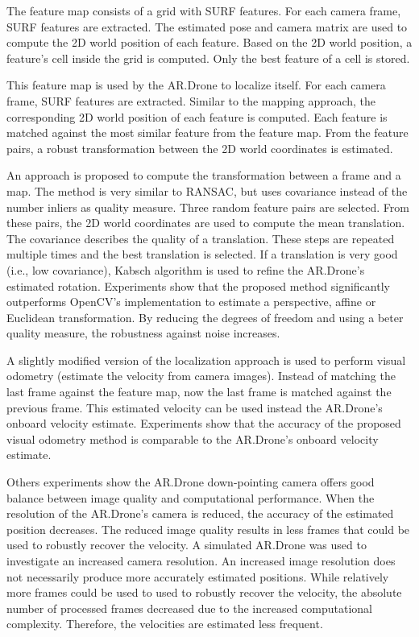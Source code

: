 The feature map consists of a grid with SURF features.
For each camera frame, SURF features are extracted.
The estimated pose and camera matrix are used to compute the 2D world position of each feature.
Based on the 2D world position, a feature's cell inside the grid is computed.
Only the best feature of a cell is stored.

This feature map is used by the AR.Drone to localize itself.
For each camera frame, SURF features are extracted.
Similar to the mapping approach, the corresponding 2D world position of each feature is computed.
Each feature is matched against the most similar feature from the feature map.
From the feature pairs, a robust transformation between the 2D world coordinates is estimated.

An approach is proposed to compute the transformation between a frame and a map.
The method is very similar to RANSAC, but uses covariance instead of the number inliers as quality measure.
Three random feature pairs are selected.
From these pairs, the 2D world coordinates are used to compute the mean translation.
The covariance describes the quality of a translation.
These steps are repeated multiple times and the best translation is selected.
If a translation is very good (i.e., low covariance), Kabsch algorithm is used to refine the AR.Drone's estimated rotation.
Experiments show that the proposed method significantly outperforms OpenCV's implementation to estimate a perspective, affine or Euclidean transformation.
By reducing the degrees of freedom and using a beter quality measure, the robustness against noise increases.

A slightly modified version of the localization approach is used to perform visual odometry (estimate the velocity from camera images).
Instead of matching the last frame against the feature map, now the last frame is matched against the previous frame.
This estimated velocity can be used instead 
 the AR.Drone's onboard velocity estimate.
Experiments show that the accuracy of the proposed visual odometry method is comparable to the AR.Drone's onboard velocity estimate.

Others experiments show the AR.Drone down-pointing camera offers good balance between image quality and computational performance.
When the resolution of the AR.Drone's camera is reduced, the accuracy of the estimated position decreases.
The reduced image quality results in less frames that could be used to robustly recover the velocity.
A simulated AR.Drone was used to investigate an increased camera resolution.
An increased image resolution does not necessarily produce more accurately estimated positions.
While relatively more frames could be used to used to robustly recover the velocity, the absolute number of processed frames decreased due to the increased computational complexity.
Therefore, the velocities are estimated less frequent.

